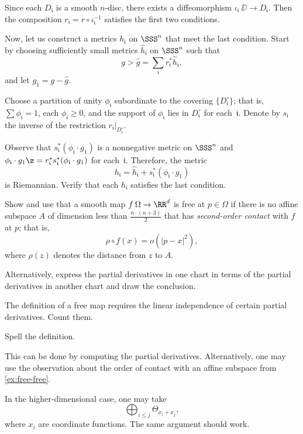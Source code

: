 Since each $D_{\mathfrak{i}}$ is a smooth $n$-disc, there exists a diffeomorphism $\iota_{\mathfrak{i}}\:\DD \to D_{\mathfrak{i}}$.
Then the composition $r_{\mathfrak{i}} = r \circ \iota_{\mathfrak{i}}^{-1}$ satisfies the first two conditions.

Now, let us construct a metrics $h_{\mathfrak{i}}$ on $\SSS^n$ that meet the last condition.
Start by choosing sufficiently small metrics $\hat h_{\mathfrak{i}}$ on $\SSS^n$ such that
\[
g > \hat g = \sum_{\mathfrak{i}} r_{\mathfrak{i}}^* \hat h_{\mathfrak{i}},
\]
and let $g_1 = g - \hat g$.

Choose a partition of unity $\phi_{\mathfrak{i}}$ subordinate to the covering $\{D_{\mathfrak{i}}^\circ\}$;
that is, $\sum \phi_{\mathfrak{i}} = 1$, each $\phi_{\mathfrak{i}} \ge 0$, and the support of $\phi_{\mathfrak{i}}$ lies in $D_{\mathfrak{i}}^\circ$ for each~$\mathfrak{i}$.
Denote by $s_{\mathfrak{i}}$ the inverse of the restriction $r_{\mathfrak{i}}|_{D_{\mathfrak{i}}^\circ}$.

Observe that $s_{\mathfrak{i}}^*(\phi_{\mathfrak{i}} \cdot g_1)$ is a nonnegative metric on $\SSS^n$ and $\phi_{\mathfrak{i}} \cdot g_1\z=r_{\mathfrak{i}}^*s_{\mathfrak{i}}^*(\phi_{\mathfrak{i}} \cdot g_1)$ for each~$\mathfrak{i}$.
Therefore, the metric
\[
h_{\mathfrak{i}} = \hat h_{\mathfrak{i}} + s_{\mathfrak{i}}^*(\phi_{\mathfrak{i}} \cdot g_1)
\]
is Riemannian.
Verify that each $h_{\mathfrak{i}}$ satisfies the last condition.


Show and use that a smooth map $f\:\Omega\to\RR^d$ is free at $p\in\Omega$ if there is no affine subspace $A$ of dimension less than $\tfrac{n\cdot (n+3)}2$ that has \emph{second-order contact} with $f$ at $p$;
that is,
\[\rho\circ f(x)=o(|p-x|^2),\]
where $\rho(z)$ denotes the distance from $z$ to $A$.

Alternatively, express the partial derivatives in one chart in terms of the partial derivatives in another chart and draw the conclusion.

The definition of a free map requires the linear independence of certain partial derivatives.
Count them.

Spell the definition.

This can be done by computing the partial derivatives.
Alternatively, one may use the observation about the order of contact with an affine subspace from \ref{ex:free-free}.

In the higher-dimensional case, one may take
\[\bigoplus_{i\le j}\Theta_{x_i+x_j},\]
where $x_i$ are coordinate functions.
The same argument should work.

